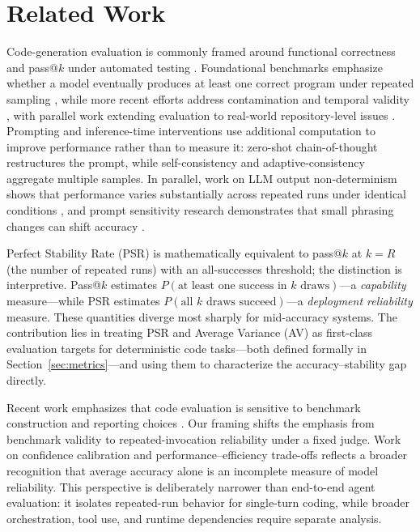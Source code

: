 \documentclass[11pt,a4paper]{article}
\begin{document}
\section{Related Work}
Code-generation evaluation is commonly framed around functional correctness and pass@$k$ under automated testing \cite{chen2021codex,austin2021program}. Foundational benchmarks emphasize whether a model eventually produces at least one correct program under repeated sampling \cite{chen2021codex,austin2021program,hendrycks2021apps}, while more recent efforts address contamination and temporal validity \cite{jain2024livecodebench}, with parallel work extending evaluation to real-world repository-level issues \cite{jimenez2024swebench}. Prompting and inference-time interventions use additional computation to improve performance rather than to measure it: zero-shot chain-of-thought \cite{kojima2022zeroshot} restructures the prompt, while self-consistency and adaptive-consistency \cite{wang2022self,aggarwal2023lets} aggregate multiple samples. In parallel, work on LLM output non-determinism shows that performance varies substantially across repeated runs under identical conditions \cite{atil2024llm,alvarado2025repetitions}, and prompt sensitivity research demonstrates that small phrasing changes can shift accuracy \cite{zhuo2024prosa}.

Perfect Stability Rate (PSR) is mathematically equivalent to pass@$k$ at $k=R$ (the number of repeated runs) with an all-successes threshold; the distinction is interpretive. Pass@$k$ estimates $P(\text{at least one success in }k\text{ draws})$---a \emph{capability} measure---while PSR estimates $P(\text{all }k\text{ draws succeed})$---a \emph{deployment reliability} measure. These quantities diverge most sharply for mid-accuracy systems. The contribution lies in treating PSR and Average Variance (AV) as first-class evaluation targets for deterministic code tasks---both defined formally in Section~\ref{sec:metrics}---and using them to characterize the accuracy--stability gap directly.

Recent work emphasizes that code evaluation is sensitive to benchmark construction and reporting choices \cite{liu2024your,du2024evaluating}. Our framing shifts the emphasis from benchmark validity to repeated-invocation reliability under a fixed judge. Work on confidence calibration \cite{guo2017calibration} and performance--efficiency trade-offs \cite{zhang2026performance} reflects a broader recognition that average accuracy alone is an incomplete measure of model reliability. This perspective is deliberately narrower than end-to-end agent evaluation: it isolates repeated-run behavior for single-turn coding, while broader orchestration, tool use, and runtime dependencies require separate analysis.
\end{document}
